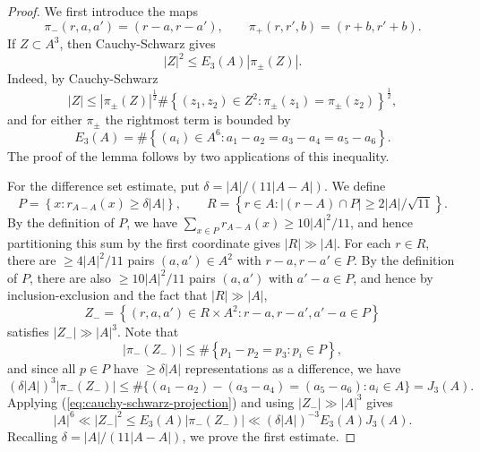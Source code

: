 \documentclass{amsart}
\numberwithin{equation}{section}
\newcommand{\de}{\delta}
\begin{document}
\begin{proof}
    We first introduce the maps
    \begin{equation}
    \label{eq:projection-maps}
        \pi_{-} (r,a,a') = (r-a, r-a') , \qquad \pi_{+} (r,r',b) = (r+b , r'+b).
    \end{equation}
    If \(Z \subset A ^{3} \), then Cauchy-Schwarz gives
    \begin{equation} 
    \label{eq:cauchy-schwarz-projection}
        \left\lvert Z \right\rvert ^{2} \leq E_3(A) \left\lvert \pi_{\pm } (Z) \right\rvert .
    \end{equation}
    Indeed, by Cauchy-Schwarz
    \[
    \left\lvert Z \right\rvert \leq  \left\lvert \pi_{\pm } (Z) \right\rvert ^{\frac{1}{2} } \# \left\{ (z_1,z_2) \in Z ^{2} : \pi_{\pm } (z_1) = \pi _{\pm } (z_2) \right\} ^{\frac{1}{2} }
    ,\]
    and for either \(\pi _{\pm } \) the rightmost term is bounded by
    \[
    E_3(A) = \# \left\{ (a_{i} )\in A^{6}: a_1 - a_2 = a_3 - a_4 = a_5 - a_6 \right\} 
    .\]
    The proof of the lemma follows by two applications of this inequality.
    
    \bigskip  
    
    For the difference set estimate, put \(\delta = \left\lvert A \right\rvert / (11 \left\lvert A-A \right\rvert )\). We define
    \[
    P = \left\{ x : r_{A-A} (x) \geq \delta \left\lvert A \right\rvert  \right\} , \qquad R = \left\{ r \in A : \left\lvert \left( r-A \right) \cap P \right\rvert  \geq 2 \left\lvert A \right\rvert / \sqrt{11} \right\} 
    .\]
    By the definition of \(P\), we have \(\sum _{x \in P} r_{A-A} (x) \geq 10 \left\lvert A \right\rvert ^{2} / 11\), and hence partitioning this sum by the first coordinate gives \(\left\lvert R \right\rvert \gg \left\lvert A \right\rvert \). 
    For each \(r \in R\), there are \(\geq 4 \left\lvert A \right\rvert ^{2} / 11\) pairs \((a,a') \in A ^{2}\) with \(r-a,r-a' \in P\). 
    By the definition of \(P\), there are also \(\geq 10 \left\lvert A \right\rvert ^{2} / 11\) pairs \((a,a')\) with \(a'-a \in P\), and hence by inclusion-exclusion and the fact that \(|R| \gg |A|\),
    \[
    Z_{-}  = \left\{ (r,a,a') \in R \times  A^{2} : r-a,r-a',a'-a \in P \right\} 
    \]
    satisfies \(\left\lvert Z_{-}  \right\rvert \gg \left\lvert A \right\rvert ^{3} \). 
    Note that 
    \[
    \left\lvert \pi_{-} (Z_{-} ) \right\rvert \leq \# \left\{ p_1 - p_2 = p_3 : p_{i} \in P \right\} 
    ,\]
    and since all \(p \in P\) have \(\geq \delta \left\lvert A \right\rvert \) representations as a difference, we have
    \[
    \left( \delta \left\lvert A \right\rvert  \right) ^{3}  \left\lvert \pi_{-} (Z_{-} ) \right\rvert \leq  \# \{ (a_1 - a_2) - (a_3 - a_4) = (a_5 - a_6) : a_i \in A  \}= J_3(A)
    .\]
    Applying (\ref{eq:cauchy-schwarz-projection}) and using \(|Z_-| \gg |A|^3\) gives
    \[
    \left\lvert A \right\rvert ^{6} \ll \left\lvert Z_{-}  \right\rvert ^{2} \leq E_3(A) \left\lvert \pi_{-} (Z_{-} ) \right\rvert \ll \left( \delta \left\lvert A \right\rvert \right) ^{-3 } E_3(A) J_3(A).
    \]
    Recalling \(\de = |A| / (11 |A-A| )\), we prove the first estimate.
    

\end{proof}
\end{document}
